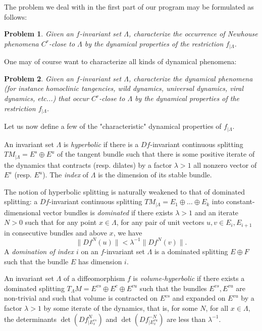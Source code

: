 \documentclass[11pt, a4paper]{amsart}
\theoremstyle{plain}
\newtheorem{problem}{Problem}[section]	    %
\theoremstyle{definition}
\theoremstyle{remark}
\numberwithin{equation}{section}         %
\begin{document}
The problem we deal with in the first part of our program may be formulated as follows:
\begin{problem}\label{p.newh}
Given an $f$-invariant set $\Lambda$, characterize the occurrence of Newhouse phenomena $C^r$-close to $\Lambda$ by the dynamical properties of the restriction $f_{|\Lambda}$.
\end{problem}

One may of course want to characterize all kinds of dynamical phenomena:

\begin{problem}\label{p.general}
Given an $f$-invariant set $\Lambda$, characterize the dynamical phenomena (for instance homoclinic tangencies, wild dynamics, universal dynamics, viral dynamics, etc...) that occur $C^r$-close to $\Lambda$ by the dynamical properties of the restriction $f_{|\Lambda}$.
\end{problem}

Let us now define a few of the "characteristic" dynamical properties of $f_{|\Lambda}$.


An invariant set $\Lambda$ is {\em hyperbolic} if there is a $Df$-invariant continuous splitting $TM_{|\Lambda}=E^s\oplus E^u$ of the tangent bundle such that there is some positive iterate of the dynamics that contracts (resp. dilates) by a factor $\lambda>1$ all nonzero vector of $E^s$ (resp. $E^u$). The {\em index} of $\Lambda$ is the dimension of its stable bundle.

The notion of hyperbolic splitting is naturally weakened to that of dominated splitting: a $Df$-invariant continuous splitting $TM_{|\Lambda}=E_1\oplus \ldots \oplus E_k$ into constant-dimensional vector bundles is {\em dominated} if there exists $\lambda>1$ and an iterate $N>0$ such that for any point $x\in \Lambda$, for any pair of unit vectors $u,v\in E_i, E_{i+1}$ in consecutive bundles and above $x$, we have
$$\|Df^N(u)\|<\lambda^{-1}\|Df^N(v)\|.$$
A {\em domination of index $i$} on an $f$-invariant set $\Lambda$ is a dominated splitting $E\oplus F$ such that the bundle $E$ has dimension $i$. 

An invariant set $\Lambda$ of a diffeomorphism $f$ is {\em volume-hyperbolic} if there exists a dominated splitting $T_\Lambda M= E^{vs}\oplus E^{c}\oplus E^{vu}$
such that the bundles $E^{vs},E^{vu}$ are non-trivial and such that volume is contracted on $E^{vs}$ and expanded on $E^{vu}$ by a factor $\lambda>1$ by some iterate of the dynamics, that is, for some  $N$, for all $x\in \Lambda$, the determinants $\det(Df^N_{|E^{vs}_x})$ and $\det(Df^{-N}_{|E^{vu}_x})$ are less than $\lambda^{-1}$.
\end{document}
